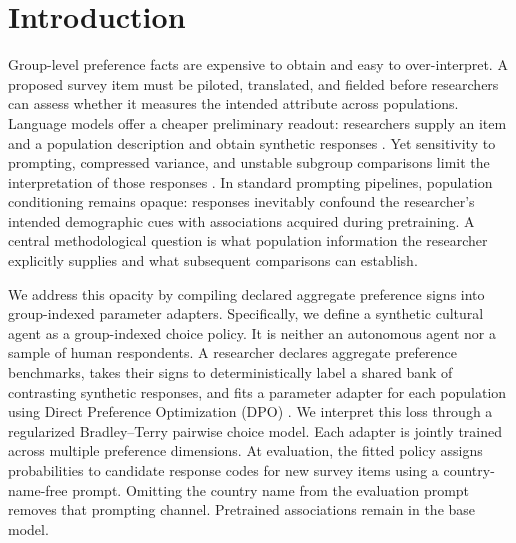 \section{Introduction}\label{sec:introduction}
Group-level preference facts are expensive to obtain and easy to over-interpret. A proposed survey item must be piloted, translated, and fielded before researchers can assess whether it measures the intended attribute across populations. Language models offer a cheaper preliminary readout: researchers supply an item and a population description and obtain synthetic responses \cite{argyle2023,horton2023,buskirk2026}. Yet sensitivity to prompting, compressed variance, and unstable subgroup comparisons limit the interpretation of those responses \cite{bisbee2024,boelaert2025,wang2025}. In standard prompting pipelines, population conditioning remains opaque: responses inevitably confound the researcher's intended demographic cues with associations acquired during pretraining. A central methodological question is what population information the researcher explicitly supplies and what subsequent comparisons can establish.

We address this opacity by compiling declared aggregate preference signs into group-indexed parameter adapters. Specifically, we define a synthetic cultural agent as a group-indexed choice policy. It is neither an autonomous agent nor a sample of human respondents. A researcher declares aggregate preference benchmarks, takes their signs to deterministically label a shared bank of contrasting synthetic responses, and fits a parameter adapter for each population using Direct Preference Optimization (DPO) \cite{rafailov2023}. We interpret this loss through a regularized Bradley--Terry pairwise choice model. Each adapter is jointly trained across multiple preference dimensions. At evaluation, the fitted policy assigns probabilities to candidate response codes for new survey items using a country-name-free prompt. Omitting the country name from the evaluation prompt removes that prompting channel. Pretrained associations remain in the base model.

